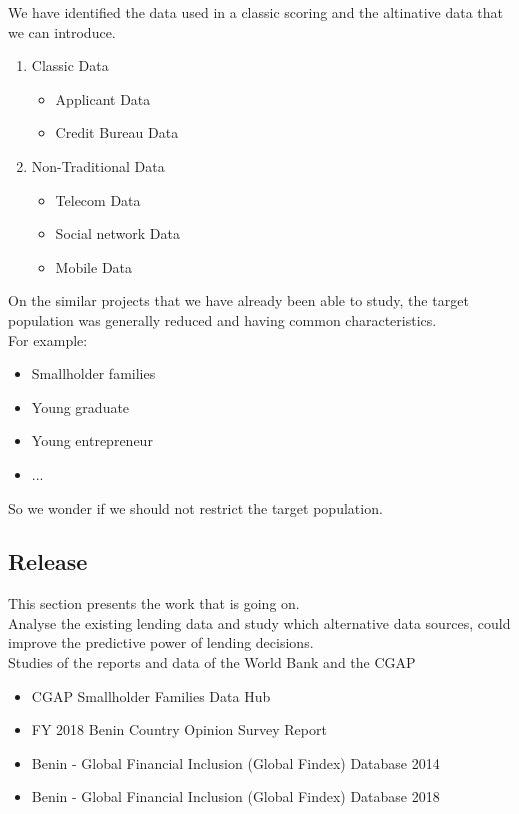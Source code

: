 \documentclass[12pt,a4paper]{amsart}
\numberwithin{equation}{section}
\theoremstyle{plain}
\theoremstyle{definition}
\begin{document}
We have identified the data used in a classic scoring and the altinative data that we can introduce.\\
\begin{enumerate}
   \item Classic Data
   \begin{itemize}
     \item Applicant Data
     \item Credit Bureau Data
   \end{itemize}
   \item Non-Traditional Data
   \begin{itemize}
     \item Telecom Data
     \item Social network Data
     \item Mobile Data     
   \end{itemize}
\end{enumerate}

On the similar projects that we have already been able to study, the target population was generally reduced and having common characteristics.\\
For example:
\begin{itemize}
 \item Smallholder families
 \item Young graduate
 \item Young entrepreneur
 \item ...
\end{itemize}
So we wonder if we should not restrict the target population.

\subsection{Release}
This section presents the work that is going on.\\
Analyse the existing lending data and study which alternative data sources,
could improve the predictive power of lending decisions.\\
Studies of the reports and data of the World Bank and the CGAP
\begin{itemize}
 \item CGAP Smallholder Families Data Hub
 \item FY 2018 Benin Country Opinion Survey Report
 \item Benin - Global Financial Inclusion (Global Findex) Database 2014
 \item Benin - Global Financial Inclusion (Global Findex) Database 2018
\end{itemize}
\end{document}
